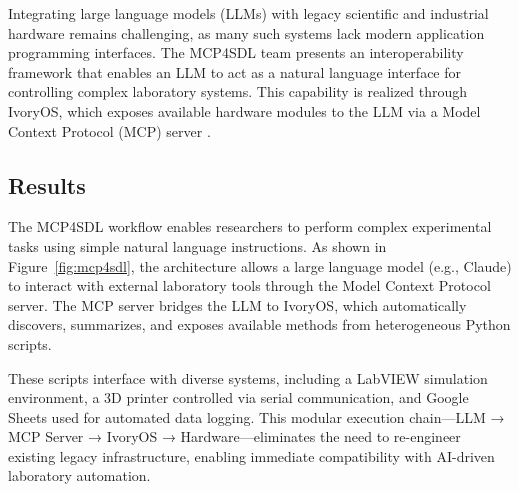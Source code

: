 
Integrating large language models (LLMs) with legacy scientific and industrial hardware remains challenging, as many such systems lack modern application programming interfaces. The MCP4SDL team presents an interoperability framework that enables an LLM to act as a natural language interface for controlling complex laboratory systems. This capability is realized through IvoryOS, which exposes available hardware modules to the LLM via a Model Context Protocol (MCP) server \cite{mcp2024, zhang_ivoryos_2025}.


\subsection*{Results}

The MCP4SDL workflow enables researchers to perform complex experimental tasks using simple natural language instructions. As shown in Figure~\ref{fig:mcp4sdl}, the architecture allows a large language model (e.g., Claude) to interact with external laboratory tools through the Model Context Protocol server. The MCP server bridges the LLM to IvoryOS, which automatically discovers, summarizes, and exposes available methods from heterogeneous Python scripts.

These scripts interface with diverse systems, including a LabVIEW simulation environment, a 3D printer controlled via serial communication, and Google Sheets used for automated data logging. This modular execution chain—LLM → MCP Server → IvoryOS → Hardware—eliminates the need to re-engineer existing legacy infrastructure, enabling immediate compatibility with AI-driven laboratory automation.

